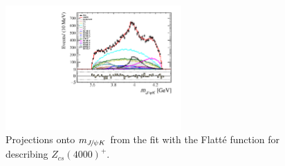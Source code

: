 \begin{figure}[t]
\centering
\includegraphics[width=0.6\textwidth]{Figures/03_Zcs/06_Amplitude/Flatte/mjpsik-Z1PZFL}%
\caption{Projections onto $m_{{{J\mskip -3mu/\mskip -2mu\psi}} K}$ from the fit with the Flatt\'e function for describing $Z_{cs}(4000)^+$.}
\label{fig:FlatteZcs}
\end{figure}








